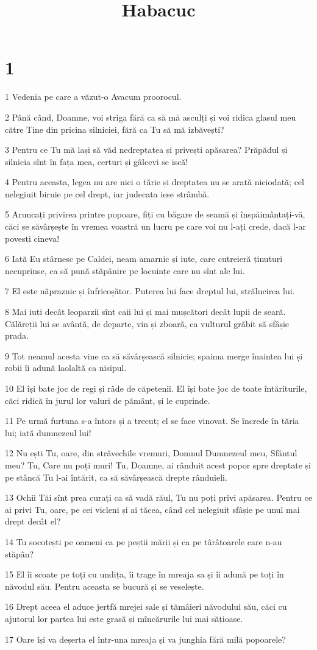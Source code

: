 

\title{Habacuc}


\chapter{1}

\par 1 Vedenia pe care a văzut-o Avacum proorocul.
\par 2 Până când, Doamne, voi striga fără ca să mă asculți și voi ridica glasul meu către Tine din pricina silniciei, fără ca Tu să mă izbăvești?
\par 3 Pentru ce Tu mă lași să văd nedreptatea și privești apăsarea? Prăpădul și silnicia sînt în fața mea, certuri și gâlcevi se iscă!
\par 4 Pentru aceasta, legea nu are nici o tărie și dreptatea nu se arată niciodată; cel nelegiuit biruie pe cel drept, iar judecata iese strâmbă.
\par 5 Aruncați privirea printre popoare, fiți cu băgare de seamă și înspăimântați-vă, căci se săvârșește în vremea voastră un lucru pe care voi nu l-ați crede, dacă l-ar povesti cineva!
\par 6 Iată Eu stârnesc pe Caldei, neam amarnic și iute, care cutreieră ținuturi necuprinse, ca să pună stăpânire pe locuințe care nu sînt ale lui.
\par 7 El este năpraznic și înfricoșător. Puterea lui face dreptul lui, strălucirea lui.
\par 8 Mai iuți decât leoparzii sînt caii lui și mai mușcători decât lupii de seară. Călăreții lui se avântă, de departe, vin și zboară, ca vulturul grăbit să sfâșie prada.
\par 9 Tot neamul acesta vine ca să săvârșească silnicie; spaima merge înaintea lui și robii îi adună laolaltă ca nisipul.
\par 10 El își bate joc de regi și râde de căpetenii. El își bate joc de toate întăriturile, căci ridică în jurul lor valuri de pământ, și le cuprinde.
\par 11 Pe urmă furtuna s-a întors și a trecut; el se face vinovat. Se încrede în tăria lui; iată dumnezeul lui!
\par 12 Nu ești Tu, oare, din străvechile vremuri, Domnul Dumnezeul meu, Sfântul meu? Tu, Care nu poți muri! Tu, Doamne, ai rânduit acest popor spre dreptate și pe stâncă Tu l-ai întărit, ca să săvârșească drepte rânduieli.
\par 13 Ochii Tăi sînt prea curați ca să vadă răul, Tu nu poți privi apăsarea. Pentru ce ai privi Tu, oare, pe cei vicleni și ai tăcea, când cel nelegiuit sfâșie pe unul mai drept decât el?
\par 14 Tu socotești pe oameni ca pe peștii mării și ca pe târâtoarele care n-au stăpân?
\par 15 El îi scoate pe toți cu undița, îi trage în mreaja sa și îi adună pe toți în năvodul său. Pentru aceasta se bucură și se veselește.
\par 16 Drept aceea el aduce jertfă mrejei sale și tămâieri năvodului său, căci cu ajutorul lor partea lui este grasă și mîncărurile lui mai sățioase.
\par 17 Oare își va deșerta el într-una mreaja și va junghia fără milă popoarele?

